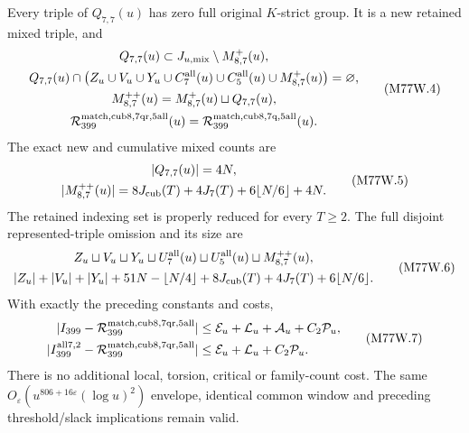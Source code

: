 \begin{theorem}
\label{AC-G214-window}
Every triple of $Q_{7,7}(u)$ has zero full original $K$-strict group.
It is a new retained mixed triple, and
\[
 \begin{gathered}
 Q_{7,7}(u)\subset J_{u,\rm mix}\setminus M_{8,7}^{+}(u),\\
 Q_{7,7}(u)\cap\bigl(Z_u\cup V_u\cup Y_u\cup C_7^{\rm all}(u)
                    \cup C_5^{\rm all}(u)\cup M_{8,7}^{+}(u)\bigr)
                                               =\varnothing,\\
 M_{8,7}^{++}(u)=M_{8,7}^{+}(u)\sqcup Q_{7,7}(u),\\
 \mathcal R_{399}^{\rm match,cub8,7qr,5all}(u)
                   =\mathcal R_{399}^{\rm match,cub8,7q,5all}(u).
 \end{gathered}\tag{M77W.4}
\]
The exact new and cumulative mixed counts are
\[
 \begin{gathered}
 |Q_{7,7}(u)|=4N,\\
 |M_{8,7}^{++}(u)|=8J_{\rm cub}(T)+4J_7(T)
                             +6\lfloor N/6\rfloor+4N.
 \end{gathered}\tag{M77W.5}
\]
The retained indexing set is properly reduced for every $T\geq2$.
The full disjoint represented-triple omission and its size are
\[
 \begin{gathered}
 Z_u\sqcup V_u\sqcup Y_u\sqcup U_7^{\rm all}(u)
              \sqcup U_5^{\rm all}(u)\sqcup M_{8,7}^{++}(u),\\
 |Z_u|+|V_u|+|Y_u|+51N-\lfloor N/4\rfloor
          +8J_{\rm cub}(T)+4J_7(T)+6\lfloor N/6\rfloor.
 \end{gathered}\tag{M77W.6}
\]
With exactly the preceding constants and costs,
\[
 \begin{aligned}
 |I_{399}-\mathcal R_{399}^{\rm match,cub8,7qr,5all}|&\leq
        \mathcal E_u+\mathcal L_u+\mathcal A_u+C_2\mathcal P_u,\\
 |I_{399}^{\rm all7,2}-\mathcal R_{399}^{\rm match,cub8,7qr,5all}|&\leq
        \mathcal E_u+\mathcal L_u+C_2\mathcal P_u.
 \end{aligned}\tag{M77W.7}
\]
There is no additional local, torsion, critical or family-count cost.
The same $O_\varepsilon(u^{806+16\varepsilon}(\log u)^2)$ envelope,
identical common window and preceding threshold/slack implications
remain valid.
\end{theorem}

